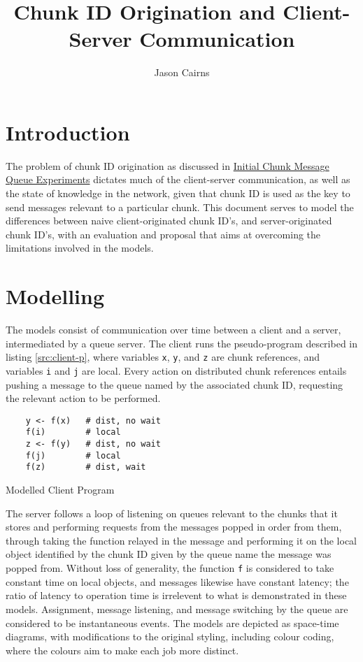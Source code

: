 \documentclass[a4paper,10pt]{article}
\begin{document}
\title{Chunk ID Origination and Client-Server Communication}
\author{Jason Cairns}
  
\maketitle{}

\section{Introduction}

The problem of chunk ID origination as discussed in
\href{init-chunk-msg-q-exp.pdf}{Initial Chunk Message Queue Experiments}
dictates much of the client-server communication, as well as the state of
knowledge in the network, given that chunk ID is used as the key to send
messages relevant to a particular chunk.
This document serves to model the differences between naive client-originated
chunk ID's, and server-originated chunk ID's, with an evaluation and proposal
that aims at overcoming the limitations involved in the models.

\section{Modelling}\label{sec:cid-model}

The models consist of communication over time between a client and a server,
intermediated by a queue server.
The client runs the pseudo-program described in listing \ref{src:client-p},
where variables \texttt{x}, \texttt{y}, and \texttt{z} are chunk references,
and variables \texttt{i} and \texttt{j} are local. 
Every action on distributed chunk references entails pushing a  message to the
queue named by the associated chunk ID, requesting the relevant action to be
performed.

\begin{listing}
\begin{verbatim}
	y <- f(x)	# dist, no wait
	f(i)		# local
	z <- f(y)	# dist, no wait
	f(j)		# local
	f(z)		# dist, wait
\end{verbatim}
\caption{Modelled Client Program}\label{src:client-p}
\end{listing}

The server follows a loop of listening on queues relevant to the chunks that it
stores and performing requests from the messages popped in order from them,
through taking the function relayed in the message and performing it on the
local object identified by the chunk ID given by the queue name the message was
popped from.
Without loss of generality, the function \texttt{f} is considered to take
constant time on local objects, and messages likewise have constant latency;
the ratio of latency to operation time is irrelevent to what is demonstrated in
these models.
Assignment, message listening, and message switching by the queue are
considered to be instantaneous events.
The models are depicted as space-time diagrams, with modifications to the
original styling\cite{lamport1978ordering}, including colour coding, where the
colours aim to make each job more distinct.
\end{document}
